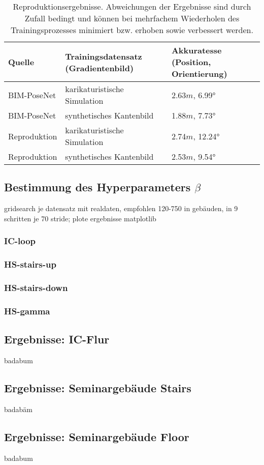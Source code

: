 \begin{table}[H]
	\centering
	\caption{Reproduktionsergebnisse. Abweichungen der Ergebnisse sind durch Zufall bedingt und können bei mehrfachem Wiederholen des Trainingsprozesses minimiert bzw. erhoben sowie verbessert werden. }
	\begin{tabularx}{1.0\textwidth}{>{\hsize=0.7\hsize}X >{\hsize=1.3\hsize}X X}
		\textbf{Quelle} & \textbf{Trainingsdatensatz} \hspace{2cm} (Gradientenbild)& \textbf{Akkuratesse} \hspace{2cm} (Position, Orientierung)\\
		\hline
		BIM-PoseNet & karikaturistische Simulation & 2.63$m$, 6.99°\\
		\hline
		BIM-PoseNet & synthetisches Kantenbild & 1.88$m$, 7.73°\\
		\hline
		Reproduktion & karikaturistische Simulation & 2.74$m$, 12.24°\\
		\hline
		Reproduktion & synthetisches Kantenbild & 2.53$m$, 9.54°\\
	\end{tabularx}
	\label{tab:reproduction}
\end{table}



\subsection{Bestimmung des Hyperparameters $\beta$}
\label{subsec:determine_beta}
gridsearch je datensatz mit realdaten, empfohlen 120-750 in gebäuden, in 9 schritten je 70 stride; plote ergebnisse matplotlib
\subsubsection{IC-loop}
\subsubsection{HS-stairs-up}
\subsubsection{HS-stairs-down}
\subsubsection{HS-gamma}

\subsection{Ergebnisse: IC-Flur }
badabum
\subsection{Ergebnisse: Seminargebäude Stairs}
badabäm
\subsection{Ergebnisse: Seminargebäude Floor}
badabum
